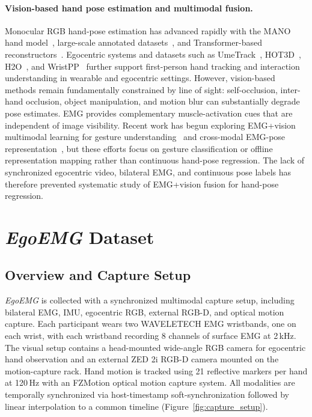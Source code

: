 \documentclass[letterpaper]{article} %
\newcommand{\dataset}{\textit{EgoEMG}}
\begin{document}
\paragraph{Vision-based hand pose estimation and multimodal fusion.}
Monocular RGB hand-pose estimation has advanced rapidly with the MANO hand model~\citep{mano}, large-scale annotated datasets~\citep{freihand,dexycb,interhand,gigahand}, and Transformer-based reconstructors~\citep{hamer,wilor}. Egocentric systems and datasets such as UmeTrack~\citep{umetrack}, HOT3D~\citep{hot3d}, H2O~\citep{h2o}, and WristPP~\citep{xi2026wristpp} further support first-person hand tracking and interaction understanding in wearable and egocentric settings. However, vision-based methods remain fundamentally constrained by line of sight: self-occlusion, inter-hand occlusion, object manipulation, and motion blur can substantially degrade pose estimates. EMG provides complementary muscle-activation cues that are independent of image visibility. Recent work has begun exploring EMG+vision multimodal learning for gesture understanding~\citep{hao2024multimodal,zandigohar2024multimodal,embridge} and cross-modal EMG-pose representation~\citep{cpep,liu2025frompose}, but these efforts focus on gesture classification or offline representation mapping rather than continuous hand-pose regression. The lack of synchronized egocentric video, bilateral EMG, and continuous pose labels has therefore prevented systematic study of EMG+vision fusion for hand-pose regression.

\section{\dataset{} Dataset}
\label{sec:dataset}

\subsection{Overview and Capture Setup}

\dataset{} is collected with a synchronized multimodal capture setup, including
bilateral EMG, IMU, egocentric RGB, external RGB-D, and optical motion capture.
Each participant wears two WAVELETECH EMG wristbands, one on each wrist, with each
wristband recording 8 channels of surface EMG at 2\,kHz. The visual setup
contains a head-mounted wide-angle RGB camera for egocentric hand observation
and an external ZED 2i RGB-D camera mounted on the motion-capture rack. Hand
motion is tracked using 21 reflective markers per hand at 120\,Hz with an FZMotion optical motion capture system. All modalities
are temporally synchronized via host-timestamp soft-synchronization
followed by linear interpolation to a common timeline (Figure~\ref{fig:capture_setup}).
\end{document}
